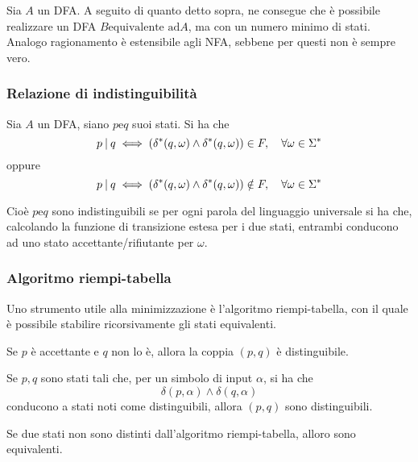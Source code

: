 \documentclass{subfiles}
\begin{document}
Sia \(A\) un DFA. A seguito di quanto detto sopra, ne consegue che è possibile realizzare un DFA \(B \text{equivalente ad} A\), ma con un numero minimo di stati.
Analogo ragionamento è estensibile agli NFA, sebbene per questi non è sempre vero.

\subsubsection{Relazione di indistinguibilità}
Sia \(A\) un DFA, siano \(p \text{e} q\) suoi stati. Si ha che
\[
    p \:{|}\: q \iff (\delta^{*}(q, \omega) \land \delta^{*}(q, \omega)) \in F, \quad \forall \omega \in \Sigma^{*}
\]
oppure
\[
    p \:{|}\: q \iff (\delta^{*}(q, \omega) \land \delta^{*}(q, \omega)) \notin F, \quad \forall \omega \in \Sigma^{*}
\]

\noindent Cioè \(p \text{e} q\) sono indistinguibili se per ogni parola del linguaggio universale si ha che, calcolando la funzione di transizione estesa per i due stati,
entrambi conducono ad uno stato accettante/rifiutante per \(\omega\).

\subsubsection{Algoritmo riempi-tabella}
Uno strumento utile alla minimizzazione è l'algoritmo riempi-tabella, con il quale è possibile stabilire ricorsivamente gli stati equivalenti.
\begin{Base*}
    Se \(p\) è accettante e \(q\) non lo è, allora la coppia \((p, q)\) è distinguibile.
\end{Base*}
\begin{Induction*}
    Se \(p, q\) sono stati tali che, per un simbolo di input \(\alpha\), si ha che
    \[
        \delta(p, \alpha) \land \delta(q, \alpha)
    \]
    conducono a stati noti come distinguibili, allora \((p, q)\) sono distinguibili.
\end{Induction*}

\begin{Theorem}
    Se due stati non sono distinti dall'algoritmo riempi-tabella, alloro sono equivalenti.
\end{Theorem}
\end{document}
